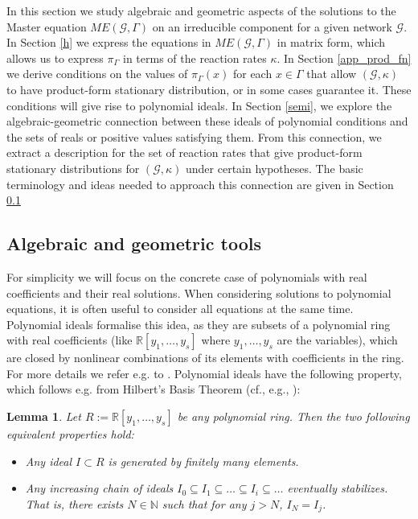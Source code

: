 \documentclass{amsart}
\newtheorem{lemma}[theorem]{Lemma}
\theoremstyle{definition}
\theoremstyle{remark}
\theoremstyle{Conjecture/open problem}
\theoremstyle{assumption}
\theoremstyle{conjecture}
\def\Ga{\Gamma}
\def\k{\kappa}
\def\cG{\mathcal{G}}
\numberwithin{equation}{section}
\begin{document}
 

In this section we study algebraic and geometric aspects of the solutions to the Master equation $ME(\cG,\Ga)$ on an irreducible component for a given network $\cG$.
In Section \ref{h} we express the equations in $ME(\cG,\Ga)$ in matrix form, which allows us to express $\pi _{\Gamma}$ in terms of the reaction rates $\k$. In Section \ref{app_prod_fn} we derive conditions on the values of $\pi _{\Gamma }(x)$ for each $x\in  \Gamma $ that allow $(\mathcal{G} ,\k)$ to have product-form stationary distribution, or in some cases guarantee it. These conditions will give rise to polynomial ideals. In Section \ref{semi}, we explore the algebraic-geometric connection between these ideals of polynomial conditions and the sets of reals or positive values satisfying them. From this connection, we extract a description for the set of reaction rates that give product-form stationary distributions for $(\mathcal{G},\k)$ under certain hypotheses. The basic terminology and ideas needed to approach this connection are given in Section \ref{sec:alg_geom}


\subsection{Algebraic and geometric tools}\label{sec:alg_geom}

For simplicity we will focus on the concrete case of polynomials with real coefficients and their real solutions. 
When considering solutions to polynomial equations, it is often useful to consider all equations at the same time. Polynomial ideals formalise this idea, as they are subsets of a polynomial ring with real coefficients (like $\mathbb{R}[y_1,\ldots ,y_s]$ where $y_1,\ldots ,y_s$ are the variables), which are closed by nonlinear combinations of its elements with coefficients in the ring. For more details we refer e.g. to \cite{Cox}. 
Polynomial ideals have the following property, which follows e.g. from Hilbert's Basis Theorem (cf., e.g., \cite[Section 2.5]{Cox}):
\begin{lemma}\label{Lemma:noet}
Let $R:=\mathbb{R}[y_1,\ldots ,y_s]$ be any polynomial ring. Then the two following  equivalent properties hold:
\begin{itemize}
	\item Any ideal $I\subset R$ is generated by finitely many elements.
	\item Any increasing chain of ideals $I_0\subseteq I_1\subseteq \ldots \subseteq I_i\subseteq \ldots  $ eventually stabilizes. That is, there exists $N\in \mathbb{N}$ such that for any $j>N$, $I_N=I_j$.
\end{itemize}
\end{lemma}
\end{document}
